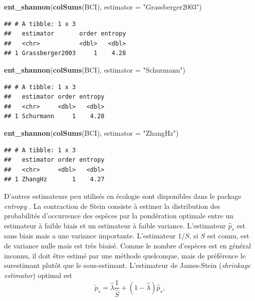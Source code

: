 \documentclass[
  11pt,
  american,
  a4paper,
  extrafontsizes,onecolumn,openright
  ]{memoir}
\newenvironment{Shaded}{\begin{snugshade}}{\end{snugshade}}
\newcommand{\AttributeTok}[1]{\textcolor[rgb]{0.13,0.29,0.53}{#1}}
\newcommand{\FunctionTok}[1]{\textcolor[rgb]{0.13,0.29,0.53}{\textbf{#1}}}
\newcommand{\NormalTok}[1]{#1}
\newcommand{\StringTok}[1]{\textcolor[rgb]{0.31,0.60,0.02}{#1}}
\begin{document}
\begin{Shaded}
\begin{Highlighting}[]
\FunctionTok{ent\_shannon}\NormalTok{(}\FunctionTok{colSums}\NormalTok{(BCI), }\AttributeTok{estimator =} \StringTok{"Grassberger2003"}\NormalTok{)}
\end{Highlighting}
\end{Shaded}

\begin{verbatim}
## # A tibble: 1 x 3
##   estimator       order entropy
##   <chr>           <dbl>   <dbl>
## 1 Grassberger2003     1    4.28
\end{verbatim}

\begin{Shaded}
\begin{Highlighting}[]
\FunctionTok{ent\_shannon}\NormalTok{(}\FunctionTok{colSums}\NormalTok{(BCI), }\AttributeTok{estimator =} \StringTok{"Schurmann"}\NormalTok{)}
\end{Highlighting}
\end{Shaded}

\begin{verbatim}
## # A tibble: 1 x 3
##   estimator order entropy
##   <chr>     <dbl>   <dbl>
## 1 Schurmann     1    4.28
\end{verbatim}

\begin{Shaded}
\begin{Highlighting}[]
\FunctionTok{ent\_shannon}\NormalTok{(}\FunctionTok{colSums}\NormalTok{(BCI), }\AttributeTok{estimator =} \StringTok{"ZhangHz"}\NormalTok{)}
\end{Highlighting}
\end{Shaded}

\begin{verbatim}
## # A tibble: 1 x 3
##   estimator order entropy
##   <chr>     <dbl>   <dbl>
## 1 ZhangHz       1    4.27
\end{verbatim}

\normalsize

D'autres estimateurs peu utilisés en écologie sont disponibles dans le package \emph{entropy} \autocite{Hausser2009}.
La contraction de Stein \autocite{James1961} consiste à estimer la distribution des probabilités d'occurrence des espèces par la pondération optimale entre un estimateur à faible biais et un estimateur à faible variance.
L'estimateur \(\hat{p}_s\) est sans biais mais a une variance importante.
L'estimateur \(1/S\), si \(S\) est connu, est de variance nulle mais est très biaisé.
Comme le nombre d'espèces est en général inconnu, il doit être estimé par une méthode quelconque, mais de préférence le surestimant plutôt que le sous-estimant.
L'estimateur de James-Stein (\emph{shrinkage estimator}) optimal est
\begin{equation}
  \label{eq:JamesStein1}
  \tilde{p}_s = \hat{\lambda}\frac{1}{\hat{S}} + \left( 1 - \hat{\lambda} \right) \hat{p}_s,
\end{equation}
\end{document}

